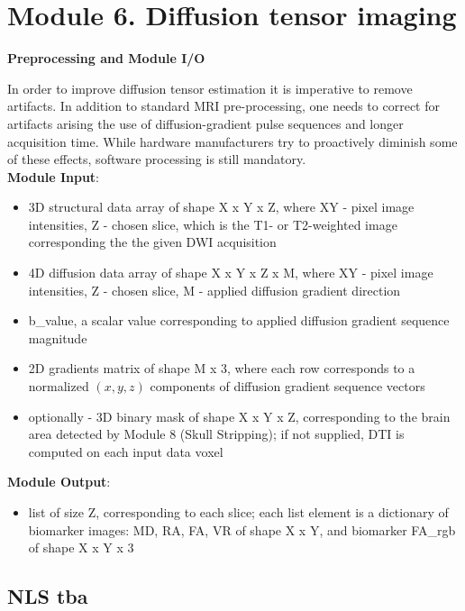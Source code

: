 \section{Module 6. Diffusion tensor imaging}

\textbf{Preprocessing and Module I/O}

In order to improve diffusion tensor estimation it is imperative to
remove artifacts. In addition to standard MRI pre-processing, one
needs to correct for artifacts arising the use of diffusion-gradient
pulse sequences and longer acquisition time. While hardware manufacturers
try to proactively diminish some of these effects, software processing
is still mandatory. 
\hfill\\

\textbf{Module Input}:
\begin{itemize}
	\item 
	3D structural data array of shape X x Y x Z, where XY - pixel image intensities, Z - chosen slice, which is the T1- or T2-weighted image corresponding the the given DWI acquisition
	
	\item 
	4D diffusion data array of shape X x Y x Z x M, where XY - pixel image intensities, Z - chosen slice, M - applied diffusion gradient direction
	
	\item 
	b\_value, a scalar value corresponding to applied diffusion gradient sequence magnitude
	
	\item 
	2D gradients matrix of shape M x 3, where each row corresponds to a normalized $(x,y,z)$ components of diffusion gradient sequence vectors
		
	\item 
	optionally - 3D binary mask of shape X x Y x Z, corresponding to the brain area detected by Module 8 (Skull Stripping); if not supplied, DTI is computed on each input data voxel

\end{itemize}
\hfill

\textbf{Module Output}:
\begin{itemize}
	\item
	list of size Z, corresponding to each slice; each list element is a dictionary of biomarker images: MD, RA, FA, VR of shape X x Y, and biomarker FA\_rgb of shape X x Y x 3
\end{itemize}


\subsection{NLS tba}

